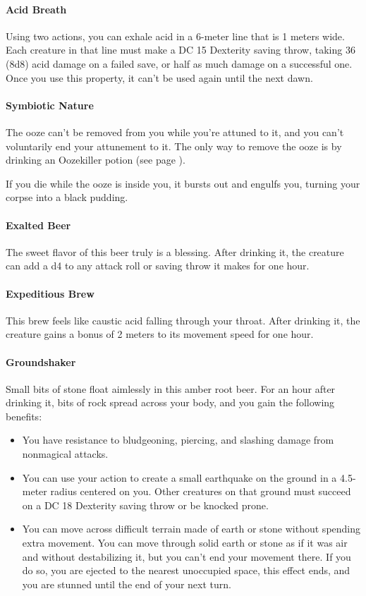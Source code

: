         \paragraph{Acid Breath} Using two actions, you can exhale acid in a 6-meter line that is 1 meters wide.
        Each creature in that line must make a DC 15 Dexterity saving throw, taking 36 (8d8) acid damage on a failed save, or half as much damage on a successful one.
        Once you use this property, it can't be used again until the next dawn.
        \paragraph{Symbiotic Nature} The ooze can't be removed from you while you're attuned to it, and you can't voluntarily end your attunement to it.
        The only way to remove the ooze is by drinking an Oozekiller potion (see page \pageref{item::oozekiller}).

        If you die while the ooze is inside you, it bursts out and engulfs you, turning your corpse into a black pudding.
    \paragraph{Exalted Beer} %
        The sweet flavor of this beer truly is a blessing.
        After drinking it, the creature can add a d4 to any attack roll or saving throw it makes for one hour.
    \paragraph{Expeditious Brew} %
        This brew feels like caustic acid falling through your throat.
        After drinking it, the creature gains a bonus of 2 meters to its movement speed for one hour.
    \paragraph{Groundshaker} %
        Small bits of stone float aimlessly in this amber root beer.
        For an hour after drinking it, bits of rock spread across your body, and you gain the following benefits:
        \begin{itemize}
            \item You have resistance to bludgeoning, piercing, and slashing damage from nonmagical attacks.
            \item You can use your action to create a small earthquake on the ground in a 4.5-meter radius centered on you.
            Other creatures on that ground must succeed on a DC 18 Dexterity saving throw or be knocked prone.
            \item You can move across difficult terrain made of earth or stone without spending extra movement.
            You can move through solid earth or stone as if it was air and without destabilizing it, but you can't end your movement there.
            If you do so, you are ejected to the nearest unoccupied space, this effect ends, and you are stunned until the end of your next turn.
        \end{itemize}
